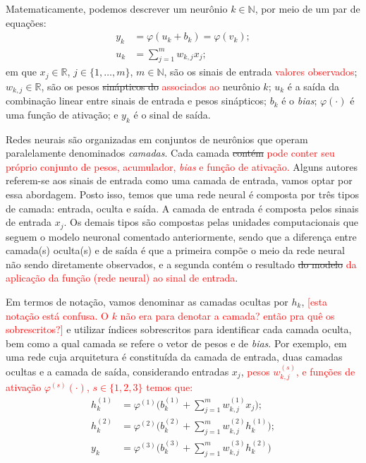 \documentclass{automatextcc}
\newcommand{\pumi}[1]{\textcolor{red}{#1}}
\newcommand{\R}{\mathds{R}}
\begin{document}
Matematicamente, podemos descrever um neurônio $k \in \mathds{N}$, por meio de um par de equações:
\begin{align*}
    y_k &= \varphi(u_k + b_k) = \varphi(v_k);\\[.2cm]
    u_k &= \displaystyle{\sum_{j=1}^{m} }w_{k,j}x_j;
\end{align*}
em que $x_j \in \R$, $j \in \{1,\dots,m\}$, $m \in \mathds{N}$, são os sinais de entrada \pumi{valores observados}; $w_{k,j} \in \R$, são os pesos \sout{sinápticos do} \pumi{associados ao} neurônio $k$; $u_k$ é a saída da combinação linear entre sinais de entrada e pesos sinápticos; $b_k$ é o \textit{bias}; $\varphi(\cdot)$ é uma função de ativação; e $y_k$ é o sinal de saída.

Redes neurais são organizadas em conjuntos de neurônios que operam paralelamente denominados \textit{camadas}. Cada camada \sout{contém} \pumi{pode conter seu próprio conjunto de pesos, acumulador, \textit{bias} e função de ativação.} Alguns autores referem-se aos sinais de entrada como uma camada de entrada, vamos optar por essa abordagem. Posto isso, temos que uma rede neural é composta por três tipos de camada: entrada, oculta e saída. A camada de entrada é composta pelos sinais de entrada $x_j$. Os demais tipos são compostas pelas unidades computacionais que seguem o modelo neuronal comentado anteriormente, sendo que a diferença entre camada(s) oculta(s) e de saída é que a primeira compõe o meio da rede neural não sendo diretamente observados, e a segunda contém o resultado \sout{do modelo} \pumi{da aplicação da função (rede neural) ao sinal de entrada}. %

Em termos de notação, vamos denominar as camadas ocultas por $h_k$, \pumi{[esta notação está confusa. O $k$ não era para denotar a camada? então pra quê os sobrescritos?]} e utilizar índices sobrescritos para identificar cada camada oculta, bem como a qual camada se refere o vetor de pesos e de \textit{bias}. Por exemplo, em uma rede cuja arquitetura é constituída da camada de entrada, duas camadas ocultas e a camada de saída, considerando entradas $x_j$, \pumi{pesos $w_{k,j}^{(s)}$, e funções de ativação $\varphi^{(s)}(\cdot)$, $s\in\{1,2,3\}$ temos que:}
\begin{align*}
    h_k^{(1)} &= \varphi^{(1)} \biggl(b_k^{(1)} + \displaystyle{\sum_{j=1}^{m} }w_{k,j}^{(1)}x_j \biggl);\\[.2cm]
    h_k^{(2)} &= \varphi^{(2)} \biggl(b_k^{(2)} + \displaystyle{\sum_{j=1}^{m} }w_{k,j}^{(2)}h_k^{(1)} \biggl);\\[.2cm]
    y_k &= \varphi^{(3)} \biggl(b_k^{(3)} + \displaystyle{\sum_{j=1}^{m} }w_{k,j}^{(3)}h_k^{(2)} \biggl)
\end{align*}
\end{document}
